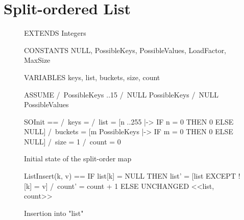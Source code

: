 \documentclass{uit-thesis}
\begin{document}
\section{Split-ordered List}
\begin{figure}
    \begin{tla}
        EXTENDS Integers

        CONSTANTS NULL, PossibleKeys, PossibleValues, LoadFactor, MaxSize

        VARIABLES keys, list, buckets, size, count

        ASSUME
            /\ PossibleKeys ..15
            /\ NULL \notin PossibleKeys
            /\ NULL \notin PossibleValues

        SOInit == /\ keys    =  {}
                  /\ list    =  [n ..255 |-> IF n = 0 THEN 0 ELSE NULL]
                  /\ buckets =  [m \in PossibleKeys |-> IF m = 0 THEN 0 ELSE NULL]
                  /\ size    =  1
                  /\ count   =  0
    \end{tla}
\begin{tlatex}
%
\@pvspace{8.0pt}%
\@pvspace{8.0pt}%
%
\@pvspace{8.0pt}%
%
%
%
%
\@pvspace{8.0pt}%
%
%
%
\end{tlatex}
    \caption{Initial state of the split-order map}
    \label{fig:split-order-init}
\end{figure}

\begin{figure}
    \begin{tla}
        ListInsert(k, v) == IF list[k] = NULL
                        THEN list' = [list EXCEPT ![k] = v] /\ count' = count + 1
                        ELSE UNCHANGED <<list, count>>
    \end{tla}
\begin{tlatex}
%
%
\end{tlatex}
    \caption{Insertion into "list"}
    \label{fig:list-insert}
\end{figure}
\end{document}
